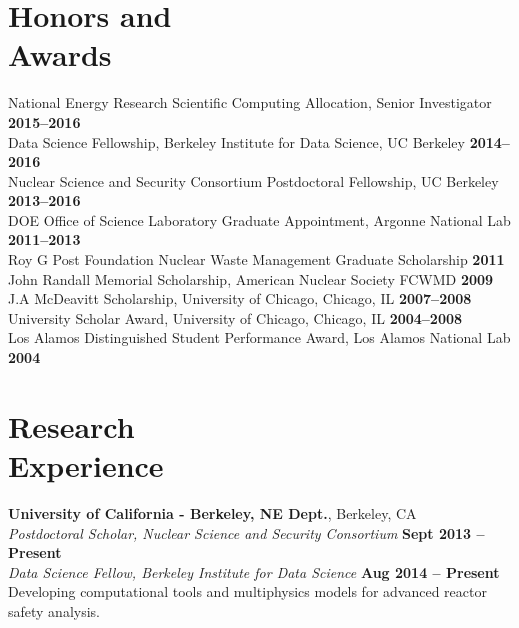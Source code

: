 \documentclass[margin,line]{resume}
\begin{document}
\begin{resume}
    \section{\mysidestyle Honors and\\Awards}
                National Energy Research Scientific Computing Allocation, Senior Investigator     \hfill \textbf{2015--2016}\vspace{.5mm}\\%
                Data Science Fellowship, Berkeley Institute for Data Science, UC Berkeley     \hfill \textbf{2014--2016}\vspace{.5mm}\\%
                Nuclear Science and Security Consortium Postdoctoral Fellowship, UC Berkeley  \hfill \textbf{2013--2016}\vspace{.5mm}\\%
		DOE Office of Science Laboratory Graduate Appointment, Argonne National Lab   \hfill \textbf{2011--2013}\vspace{.5mm}\\%
		Roy G  Post Foundation Nuclear Waste Management Graduate Scholarship                \hfill \textbf{2011}\vspace{.5mm}\\%
		John Randall Memorial Scholarship, American Nuclear Society FCWMD                   \hfill \textbf{2009}\vspace{.5mm}\\%
		J.A  McDeavitt Scholarship, University of Chicago, Chicago, IL                 \hfill\textbf{2007--2008}\vspace{.5mm}\\%
		University Scholar Award, University of Chicago, Chicago, IL                   \hfill\textbf{2004--2008}\vspace{.5mm}\\%
		Los Alamos Distinguished Student Performance Award, Los Alamos National Lab                         \hfill\textbf{2004}%
    \section{\mysidestyle Research\\Experience}
    \textbf{University of California - Berkeley, NE Dept.}, Berkeley, CA \\
		\textsl{Postdoctoral Scholar, Nuclear Science and Security Consortium} \hfill \textbf{Sept 2013 -- Present}\\
		\textsl{Data Science Fellow, Berkeley Institute for Data Science} \hfill \textbf{Aug 2014 -- Present}\\
                Developing computational tools and multiphysics models for advanced reactor safety analysis.


\end{resume}
\end{document}
